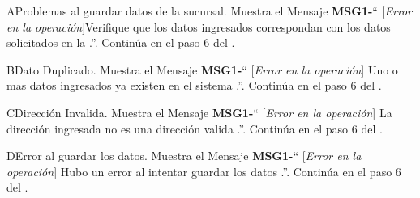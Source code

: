 

\begin{UCtrayectoriaA}{A}{Problemas al guardar datos de la sucursal.}
			\UCpaso Muestra el Mensaje {\bf MSG1-}`` [{\em Error en la operación}]Verifique que los datos ingresados correspondan con los datos solicitados en la  .''.
			\UCpaso Continúa en el paso 6 del .
		\end{UCtrayectoriaA}
\begin{UCtrayectoriaA}{B}{Dato Duplicado.}
			\UCpaso Muestra el Mensaje {\bf MSG1-}`` [{\em Error en la operación}] Uno o mas datos ingresados ya existen en el sistema  .''.
			\UCpaso Continúa en el paso 6 del .
		\end{UCtrayectoriaA}
\begin{UCtrayectoriaA}{C}{Dirección Invalida.}
			\UCpaso Muestra el Mensaje {\bf MSG1-}`` [{\em Error en la operación}] La dirección ingresada no es una dirección valida  .''.
			\UCpaso Continúa en el paso 6 del .
		\end{UCtrayectoriaA}
\begin{UCtrayectoriaA}{D}{Error al guardar los datos.}
			\UCpaso Muestra el Mensaje {\bf MSG1-}`` [{\em Error en la operación}] Hubo un error al intentar guardar los datos .''.
			\UCpaso Continúa en el paso 6 del .
		\end{UCtrayectoriaA}
